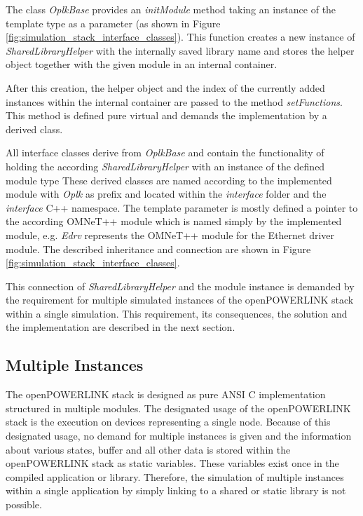 The class \emph{OplkBase} provides an \emph{initModule} method taking an instance of the template type as a parameter (as shown in Figure \ref{fig:simulation_stack_interface_classes}).
This function creates a new instance of \emph{SharedLibraryHelper} with the internally saved library name and stores the helper object together with the given module in an internal container.

After this creation, the helper object and the index of the currently added instances within the internal container are passed to the method \emph{setFunctions}.
This method is defined pure virtual and demands the implementation by a derived class.

All interface classes derive from \emph{OplkBase} and contain the functionality of holding the according \emph{SharedLibraryHelper} with an instance of the defined module type
These derived classes are named according to the implemented module with \emph{Oplk} as prefix and located within the \emph{interface} folder and the \emph{interface} C++ namespace.
The template parameter is mostly defined a pointer to the according OMNeT++ module which is named simply by the implemented module, e.g. \emph{Edrv} represents the OMNeT++ module for the Ethernet driver module.
The described inheritance and connection are shown in Figure \ref{fig:simulation_stack_interface_classes}.

\begin{sloppypar}
This connection of \emph{SharedLibraryHelper} and the module instance is demanded by the requirement for multiple simulated instances of the openPOWERLINK stack within a single simulation.
This requirement, its consequences, the solution and the implementation are described in the next section.
\end{sloppypar}

\subsection{Multiple Instances}
\label{sec:porting_stack_multiinstance}
\begin{sloppypar}
The openPOWERLINK stack is designed as pure ANSI C implementation structured in multiple modules.
The designated usage of the openPOWERLINK stack is the execution on devices representing a single node.
Because of this designated usage, no demand for multiple instances is given and the information about various states, buffer and all other data is stored within the openPOWERLINK stack as static variables.
These variables exist once in the compiled application or library.
Therefore, the simulation of multiple instances within a single application by simply linking to a shared or static library is not possible.
\end{sloppypar}

